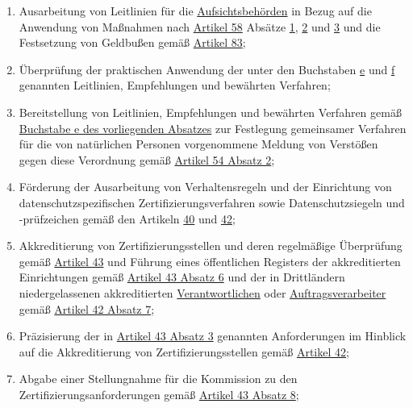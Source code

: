 \begin{enumerate}
\begin{enumerate}
    \item Ausarbeitung von Leitlinien für die \hyperref[itm:04-21]{Aufsichtsbehörden} in Bezug auf die Anwendung von
     Maßnahmen nach \hyperref[ch:58]{Artikel 58} Absätze \hyperref[itm:58-1]{1}, \hyperref[itm:58-2]{2} und \hyperref
     [itm:58-3]{3} und die Festsetzung von Geldbußen gemäß \hyperref[ch:83]{Artikel 83};
    \label{itm:70-1k}

    \item Überprüfung der praktischen Anwendung der unter den Buchstaben \hyperref[itm:70-1e]{e} und \hyperref
     [itm:70-1f]{f} genannten Leitlinien, Empfehlungen und bewährten Verfahren;
    \label{itm:70-1l}

    \item Bereitstellung von Leitlinien, Empfehlungen und bewährten Verfahren gemäß \hyperref[itm:70-1e]{Buchstabe e des
     vorliegenden Absatzes} zur Festlegung gemeinsamer Verfahren für die von natürlichen Personen vorgenommene Meldung
     von Verstößen gegen diese Verordnung gemäß \hyperref[itm:54-2]{Artikel 54 Absatz 2};
    \label{itm:70-1m}

    \item Förderung der Ausarbeitung von Verhaltensregeln und der Einrichtung von datenschutzspezifischen
     Zertifizierungsverfahren sowie Datenschutzsiegeln und -prüfzeichen gemäß den Artikeln \hyperref[ch:40]{40} und
     \hyperref[ch:42]{42};
    \label{itm:70-1n}

    \item Akkreditierung von Zertifizierungsstellen und deren regelmäßige Überprüfung gemäß \hyperref[ch:43]{Artikel 43}
     und Führung eines öffentlichen Registers der akkreditierten Einrichtungen gemäß \hyperref[itm:43-6]{Artikel 43
     Absatz 6} und der in Drittländern niedergelassenen akkreditierten \hyperref[itm:04-7]
     {Verantwortlichen} oder \hyperref[itm:04-8]{Auftragsverarbeiter} gemäß \hyperref[itm:42-7]{Artikel 42 Absatz 7};
    \label{itm:70-1o}

    \item Präzisierung der in \hyperref[itm:43-3]{Artikel 43 Absatz 3} genannten Anforderungen im Hinblick auf die
     Akkreditierung von Zertifizierungsstellen gemäß \hyperref[ch:42]{Artikel 42};
    \label{itm:70-1p}

    \item Abgabe einer Stellungnahme für die Kommission zu den Zertifizierungsanforderungen gemäß \hyperref[itm:43-8]
     {Artikel 43 Absatz 8};
    \label{itm:70-1q}


\end{enumerate}
\end{enumerate}
